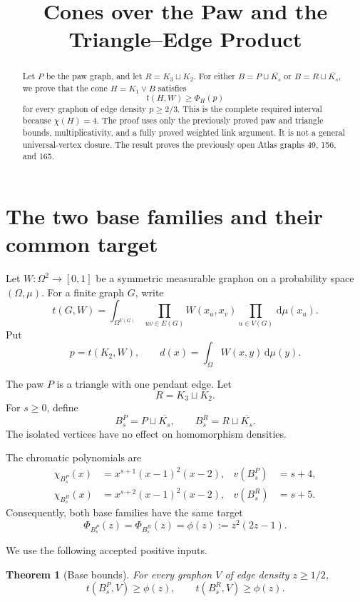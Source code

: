 \documentclass[11pt]{article}
\title{Cones over the Paw and the Triangle--Edge Product}
\author{}
\date{}
\newtheorem{theorem}{Theorem}[section]
\newcommand{\dd}{\,\mathrm{d}}
\newcommand{\join}{\mathbin{\vee}}
\begin{document}
\maketitle

\begin{abstract}
Let $P$ be the paw graph, and let $R=K_3\sqcup K_2$.  For either
$B=P\sqcup\overline{K_s}$ or
$B=R\sqcup\overline{K_s}$, we prove that the cone
$H=K_1\join B$ satisfies
\[
t(H,W)\geq\Phi_H(p)
\]
for every graphon of edge density $p\geq2/3$.  This is the complete
required interval because $\chi(H)=4$.  The proof uses only the
previously proved paw and triangle bounds, multiplicativity, and a
fully proved weighted link argument.  It is not a general
universal-vertex closure.  The result proves the previously open Atlas
graphs 49, 156, and 165.
\end{abstract}


\section{The two base families and their common target}

Let $W\colon\Omega^2\to[0,1]$ be a symmetric measurable graphon on a
probability space $(\Omega,\mu)$.  For a finite graph $G$, write
\[
t(G,W)=
\int_{\Omega^{V(G)}}
\prod_{uv\in E(G)}W(x_u,x_v)
\prod_{u\in V(G)}\dd\mu(x_u).
\]
Put
\[
p=t(K_2,W),
\qquad
d(x)=\int_\Omega W(x,y)\dd\mu(y).
\]

The paw $P$ is a triangle with one pendant edge.  Let
\[
R=K_3\sqcup K_2.
\]
For $s\geq0$, define
\[
B_s^P=P\sqcup\overline{K_s},
\qquad
B_s^R=R\sqcup\overline{K_s}.
\]
The isolated vertices have no effect on homomorphism densities.

The chromatic polynomials are
\begin{align*}
\chi_{B_s^P}(x)
&=x^{s+1}(x-1)^2(x-2),
&v(B_s^P)&=s+4,
\\
\chi_{B_s^R}(x)
&=x^{s+2}(x-1)^2(x-2),
&v(B_s^R)&=s+5.
\end{align*}
Consequently, both base families have the same target
\begin{equation}
\Phi_{B_s^P}(z)=\Phi_{B_s^R}(z)
=\phi(z):=z^2(2z-1).
\label{eq:base-target}
\end{equation}

We use the following accepted positive inputs.

\begin{theorem}[Base bounds]
\label{thm:base}
For every graphon $V$ of edge density $z\geq1/2$,
\[
t(B_s^P,V)\geq\phi(z),
\qquad
t(B_s^R,V)\geq\phi(z).
\]
\end{theorem}
\end{document}
